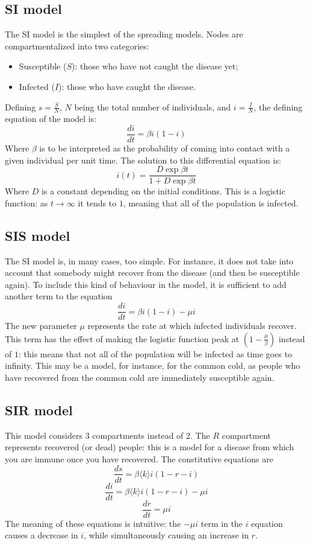 \documentclass[sigchi]{acmart}
\begin{document}
\subsection{SI model}
The SI model is the simplest of the spreading models. Nodes are compartmentalized into two categories:
\begin{itemize}
    \item Susceptible ($S$): those who have not caught the disease yet;
    \item Infected ($I$): those who have caught the disease.
\end{itemize}
Defining $s = \frac{S}{N}$, $N$ being the total number of individuals, and $i = \frac{I}{N}$, the defining equation of the model is:
$$\frac{di}{dt} =\beta i (1-i) $$
Where $\beta$ is to be interpreted as the probability of coming into contact with a given individual per unit time.
The solution to this differential equation is:
$$i(t) = \frac{D\exp{\beta t}}{1+D\exp{\beta t}}$$
Where $D$ is a constant depending on the initial conditions. This is a logistic function: as $t \to \infty$ it tends to $1$, meaning that all of the population is infected.
\subsection{SIS model} The SI model is, in many cases, too simple. For instance, it does not take into account that somebody might recover from the disease (and then be susceptible again). To include this kind of behaviour in the model, it is sufficient to add another term to the equation
$$\frac{di}{dt} = \beta i(1-i) - \mu i$$
The new parameter $\mu$ represents the rate at which infected individuals recover. This term has the effect of making the logistic function peak at $(1-\frac{\mu}{\beta})$ instead of $1$: this means that not all of the population will be infected as time goes to infinity. This may be a model, for instance, for the common cold, as people who have recovered from the common cold are immediately susceptible again.
\subsection{SIR model}
This model considers 3 compartments instead of 2. The $R$ compartment represents recovered (or dead) people: this is a model for a disease from which you are immune once you have recovered. The constitutive equations are
$$\frac{ds}{dt} = \beta \langle k \rangle i(1-r-i)$$
$$\frac{di}{dt} = \beta \langle k \rangle i(1-r-i) -\mu i$$
$$\frac{dr}{dt} = \mu i$$
The meaning of these equations is intuitive: the $-\mu i$ term in the $i$ equation causes a decrease in $i$, while simultaneously causing an increase in $r$.
\end{document}
